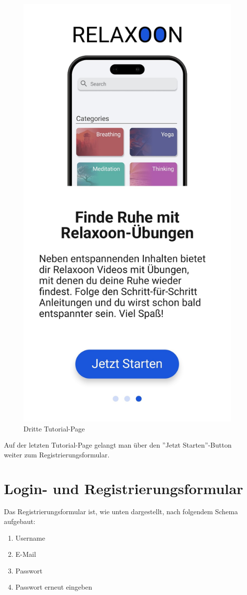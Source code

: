 \begin{figure}[H]
    \centering
    \includegraphics[height=\textwidth]{./pics/Tutorial3.jpg}
    \caption{Dritte Tutorial-Page}
\end{figure}

Auf der letzten Tutorial-Page gelangt man über den ''Jetzt Starten''-Button weiter zum Registrierungsformular.

\section{Login- und Registrierungsformular}

Das Registrierungsformular ist, wie unten dargestellt, nach folgendem Schema aufgebaut:

\begin{enumerate}
    \item Username
    \item E-Mail
    \item Passwort
    \item Passwort erneut eingeben
\end{enumerate}

